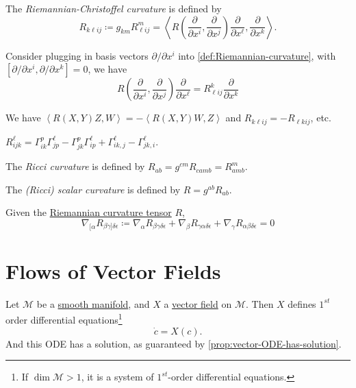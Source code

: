 \begin{definition}\label{def:Riemannian-Christoffel-curvature}
	The \emph{Riemannian-Christoffel curvature}	is defined by
	\[
		R_{k \ell ij}
		\coloneqq g_{km} R^m_{\ell ij}
		= \left\langle R\left( \frac{\partial }{\partial x^i}, \frac{\partial }{\partial x^j} \right) \frac{\partial }{\partial x^{\ell } }, \frac{\partial }{\partial x^k}  \right\rangle.
	\]
\end{definition}

Consider plugging in basis vectors \(\partial / \partial x^i\) into \autoref{def:Riemannian-curvature}, with \([\partial /\partial x^i, \partial / \partial x^k] = 0\), we have
\[
	R\left( \frac{\partial }{\partial x^i}, \frac{\partial }{\partial x^j} \right) \frac{\partial }{\partial x^{\ell } } = R^k_{\ell i j } \frac{\partial }{\partial x^k}
\]

\begin{remark}
	We have \(\left\langle R(X, Y)Z, W \right\rangle = -\left\langle R(X, Y)W, Z \right\rangle\) and \(R_{k \ell i j} = -R_{\ell k i j}\), etc.
\end{remark}

\begin{remark}
	\(R^{\ell }_{ijk} = \Gamma _{ik}^p \Gamma ^\ell _{jp} - \Gamma ^p_{jk} \Gamma ^\ell _{ip} + \Gamma ^\ell _{ik, j} - \Gamma ^\ell _{jk, i}\).
\end{remark}

\begin{definition}\label{def:Ricci-curvature}
	The \emph{Ricci curvature} is defined by \(R_{ab} = g^{cm}R_{c a m b} = R^m_{amb}\).
\end{definition}

\begin{definition}\label{def:Ricci-scalar-curvature}
	The \emph{(Ricci) scalar curvature} is defined by \(R = g^{ab}R_{ab}\).
\end{definition}

\begin{proposition}
	Given the \hyperref[def:Riemannian-curvature]{Riemannian curvature tensor} \(R\),
	\[
		\nabla _{[\alpha} R_{\beta \gamma ]\delta \epsilon }
		\coloneqq \nabla _\alpha R_{\beta \gamma \delta \epsilon }
		+ \nabla _\beta R_{\gamma \alpha \delta \epsilon }
		+ \nabla _\gamma R_{\alpha \beta \delta \epsilon }
		= 0
	\]
\end{proposition}

\section{Flows of Vector Fields}
Let \(\mathcal{M} \) be a \hyperref[def:smooth-manifold]{smooth manifold}, and \(X\) a \hyperref[def:vector-field]{vector field} on \(\mathcal{M} \). Then \(X\) defines \(1^{st}\) order differential equations\footnote{If \(\dim \mathcal{M} > 1\), it is a system of \(1^{st} \)-order differential equations.}
\[
	\dot{c} = X(c).
\]
And this ODE has a solution, as guaranteed by \autoref{prop:vector-ODE-has-solution}.

